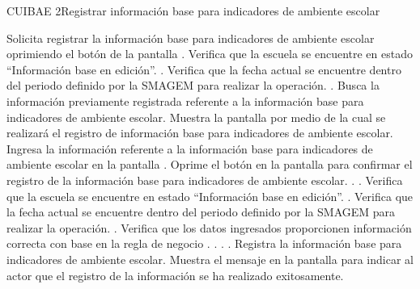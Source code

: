 \begin{UseCase}{CUIBAE 2}{Registrar información base para indicadores de ambiente escolar}

\end{UseCase}

\begin{UCtrayectoria}
    \UCpaso[\UCactor] Solicita registrar la información base para indicadores de ambiente escolar oprimiendo el botón \botEdit de la pantalla .
    \UCpaso[\UCsist] Verifica que la escuela se encuentre en estado ``Información base en edición''. .
    \UCpaso[\UCsist] Verifica que la fecha actual se encuentre dentro del periodo definido por la SMAGEM para realizar la operación. .
    \UCpaso[\UCsist] Busca la información previamente registrada referente a la información base para indicadores de ambiente escolar.
    \UCpaso[\UCsist] Muestra la pantalla  por medio de la cual se realizará el registro de información base para indicadores de ambiente escolar.
    \UCpaso[\UCactor] Ingresa la información referente a la información base para indicadores de ambiente escolar en la pantalla . \label{cuibae2:IngresarDatos}
    \UCpaso[\UCactor] Oprime el botón  en la pantalla  para confirmar el registro de la información base para indicadores de ambiente escolar. . . 
    \UCpaso[\UCsist] Verifica que la escuela se encuentre en estado ``Información base en edición''. . \label{cuibae2:VerificarRegistro}
    \UCpaso[\UCsist] Verifica que la fecha actual se encuentre dentro del periodo definido por la SMAGEM para realizar la operación. .
    \UCpaso[\UCsist] Verifica que los datos ingresados proporcionen información correcta con base en la regla de negocio . . . .     
    \UCpaso[\UCsist] Registra la información base para indicadores de ambiente escolar.
    \UCpaso[\UCsist] Muestra el mensaje  en la pantalla  para indicar al actor que el registro de la información se ha realizado exitosamente.    
 \end{UCtrayectoria}
 
